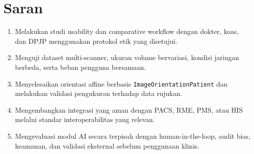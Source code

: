 \documentclass[12pt,a4paper,oneside]{report}
\begin{document}
\section{Saran}
\begin{enumerate}[label=\arabic*.]
\item Melakukan studi usability dan comparative workflow dengan dokter, koas, dan DPJP menggunakan protokol etik yang disetujui.
\item Menguji dataset multi-scanner, ukuran volume bervariasi, kondisi jaringan berbeda, serta beban pengguna bersamaan.
\item Menyelesaikan orientasi affine berbasis \texttt{ImageOrientationPatient} dan melakukan validasi pengukuran terhadap data rujukan.
\item Mengembangkan integrasi yang aman dengan PACS, RME, PMS, atau HIS melalui standar interoperabilitas yang relevan.
\item Mengevaluasi modul AI secara terpisah dengan human-in-the-loop, audit bias, keamanan, dan validasi eksternal sebelum penggunaan klinis.
\end{enumerate}
\end{document}
